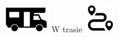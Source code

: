 \documentclass{article}
\date{}
\begin{document}
\begin{center}
\includegraphics[width=0.15\textwidth]{camper.png}
\hfill
\Huge{W trasie}
\hfill
\includegraphics[width=0.1\textwidth]{trip.png}
\end{center}



\begin{multicols}{2}


\end{multicols}
\end{document}

